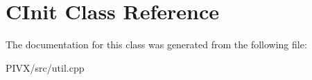 \hypertarget{class_c_init}{}\section{C\+Init Class Reference}
\label{class_c_init}


The documentation for this class was generated from the following file\+:\begin{DoxyCompactItemize}
\item 
P\+I\+V\+X/src/util.\+cpp\end{DoxyCompactItemize}
